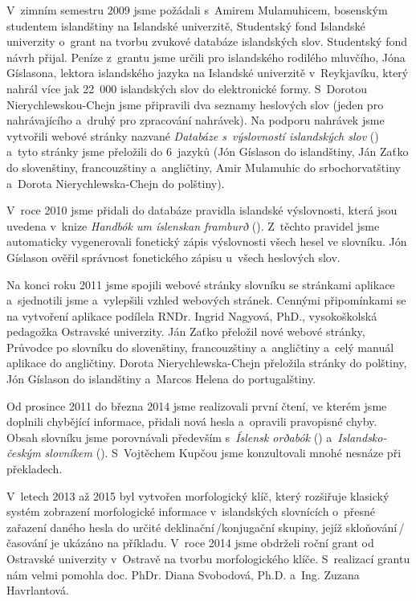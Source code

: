 V~zimním semestru 2009 jsme požádali s~Amirem Mulamuhicem, bosenským studentem islandštiny na Islandské univerzitě, Studentský fond Islandské univerzity o~grant na tvorbu zvukové databáze islandských slov. 
Studentský fond návrh přijal. Peníze z~grantu jsme určili pro islandského rodilého mluvčího, Jóna Gíslasona, lektora islandského jazyka na Islandské univerzitě v~Reykjavíku, který nahrál více jak 22~000 islandských slov do elektronické formy. 
S~Dorotou Nierychlewskou-Chejn jsme připravili dva seznamy heslových slov (jeden pro nahrávajícího a~druhý pro zpracování nahrávek). Na podporu nahrávek jsme vytvořili webové stránky nazvané \textit{Databáze s~výslovností islandských slov} (\cite {int13}) a~tyto stránky jsme přeložili do 6~jazyků (Jón Gíslason do islandštiny, Ján Zaťko do slovenštiny, francouzštiny a~angličtiny, Amir Mulamuhic do srbochorvatštiny a~Dorota Nierychlewska-Chejn do polštiny).

V~roce 2010 jsme přidali do databáze pravidla islandské výslovnosti, která jsou uvedena v~knize \textit{Handbók um íslenskan framburð} (\cite {is2}). Z~těchto pravidel jsme automaticky vygenerovali fonetický zápis výslovnosti všech hesel ve slovníku. 
Jón Gíslason ověřil správnost fonetického zápisu u~všech heslových slov.

Na konci roku 2011 jsme spojili webové stránky slovníku se stránkami aplikace a~sjednotili jsme a~vylepšili vzhled webových stránek. Cennými připomínkami se na vytvoření aplikace podílela
RNDr. Ingrid Nagyová, PhD., vysokoškolská pedagožka Ostravské univerzity. Ján Zaťko přeložil nové webové stránky, Průvodce po slovníku do slovenštiny, francouzštiny a~angličtiny a~celý manuál aplikace do angličtiny. 
Dorota Nierychlewska-Chejn přeložila stránky do polštiny, Jón Gíslason do islandštiny a~Marcos Helena do portugalštiny.

Od prosince 2011 do března 2014 jsme realizovali první čtení, ve kterém jsme doplnili chybějící informace, přidali nová hesla a~opravili pravopisné chyby. 
Obsah slovníku jsme porovnávali především s~\textit{Íslensk orðabók} (\mbox{\cite {is}}) a~\textit{Islandsko-českým slovníkem} (\cite {is7}). S~Vojtěchem Kupčou jsme konzultovali mnohé nesnáze při překladech.

V~letech 2013 až 2015 byl vytvořen morfologický klíč, který rozšiřuje klasický systém zobrazení morfologické informace v~islandských slovnících o~přesné zařazení daného hesla do určité deklinační\,/\addthin konjugační skupiny, jejíž
skloňování\,/\addthin časování je ukázáno na příkladu. V~roce 2014 jsme obdrželi roční grant od Ostravské univerzity v~Ostravě na tvorbu morfologického klíče. S~realizací grantu nám velmi pomohla doc. PhDr. Diana Svobodová, Ph.D. a~Ing. Zuzana Havrlantová.

